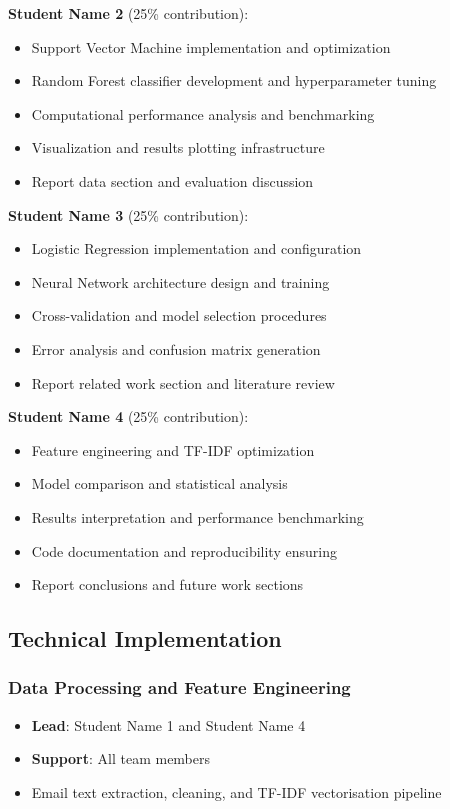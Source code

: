 \documentclass[11pt,a4paper]{article}
\begin{document}
\textbf{Student Name 2} (25\% contribution):
\begin{itemize}
    \item Support Vector Machine implementation and optimization
    \item Random Forest classifier development and hyperparameter tuning
    \item Computational performance analysis and benchmarking
    \item Visualization and results plotting infrastructure
    \item Report data section and evaluation discussion
\end{itemize}

\textbf{Student Name 3} (25\% contribution):
\begin{itemize}
    \item Logistic Regression implementation and configuration
    \item Neural Network architecture design and training
    \item Cross-validation and model selection procedures
    \item Error analysis and confusion matrix generation
    \item Report related work section and literature review
\end{itemize}

\textbf{Student Name 4} (25\% contribution):
\begin{itemize}
    \item Feature engineering and TF-IDF optimization
    \item Model comparison and statistical analysis
    \item Results interpretation and performance benchmarking
    \item Code documentation and reproducibility ensuring
    \item Report conclusions and future work sections
\end{itemize}

\subsection{Technical Implementation}

\subsubsection{Data Processing and Feature Engineering}
\begin{itemize}
    \item \textbf{Lead}: Student Name 1 and Student Name 4
    \item \textbf{Support}: All team members
    \item Email text extraction, cleaning, and TF-IDF vectorisation pipeline
\end{itemize}
\end{document}
